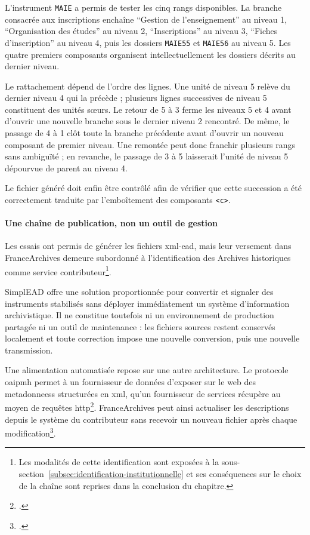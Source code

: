 L'instrument \texttt{MAIE} a permis de tester les cinq rangs disponibles. La branche consacrée aux inscriptions enchaîne \enquote{Gestion de l'enseignement} au niveau 1, \enquote{Organisation des études} au niveau 2, \enquote{Inscriptions} au niveau 3, \enquote{Fiches d'inscription} au niveau 4, puis les dossiers \texttt{MAIE55} et \texttt{MAIE56} au niveau 5. Les quatre premiers composants organisent intellectuellement les dossiers décrits au dernier niveau.

Le rattachement dépend de l'ordre des lignes. Une unité de niveau 5 relève du dernier niveau 4 qui la précède ; plusieurs lignes successives de niveau 5 constituent des unités sœurs. Le retour de 5 à 3 ferme les niveaux 5 et 4 avant d'ouvrir une nouvelle branche sous le dernier niveau 2 rencontré. De même, le passage de 4 à 1 clôt toute la branche précédente avant d'ouvrir un nouveau composant de premier niveau. Une remontée peut donc franchir plusieurs rangs sans ambiguïté ; en revanche, le passage de 3 à 5 laisserait l'unité de niveau 5 dépourvue de parent au niveau 4.

Le fichier généré doit enfin être contrôlé afin de vérifier que cette succession a été correctement traduite par l'emboîtement des composants \texttt{<c>}.

\paragraph{Une chaîne de publication, non un outil de gestion}

Les essais ont permis de générer les fichiers \gls{xml}-\gls{ead}, mais leur versement dans FranceArchives demeure subordonné à l'identification des Archives historiques comme service contributeur\footnote{Les modalités de cette identification sont exposées à la sous-section~\ref{subsec:identification-institutionnelle} et ses conséquences sur le choix de la chaîne sont reprises dans la conclusion du chapitre.}.

SimplEAD offre une solution proportionnée pour convertir et signaler des instruments stabilisés sans déployer immédiatement un système d'information archivistique. Il ne constitue toutefois ni un environnement de production partagée ni un outil de maintenance : les fichiers sources restent conservés localement et toute correction impose une nouvelle conversion, puis une nouvelle transmission.

Une alimentation automatisée repose sur une autre architecture. Le protocole \gls{oaipmh} permet à un fournisseur de données d'exposer sur le web des \glspl{metadonnees} structurées en \gls{xml}, qu'un fournisseur de services récupère au moyen de requêtes \gls{http}\footcite{OAIPMH2002}. FranceArchives peut ainsi actualiser les descriptions depuis le système du contributeur sans recevoir un nouveau fichier après chaque modification\footcite{FranceArchivesRejoindre2026}.

